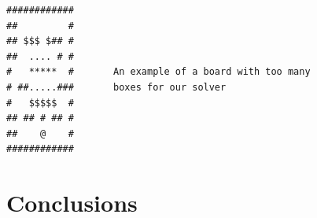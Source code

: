 \documentclass[a4paper,10pt]{article}
\begin{document}
\begin{verbatim}
############
##         #
## $$$ $## #
##  .... # #
#   *****  #       An example of a board with too many
# ##.....###       boxes for our solver
#   $$$$$  #
## ## # ## #
##    @    #
############
\end{verbatim}


\section{Conclusions}
   
      
 
 
	
\end{document}
